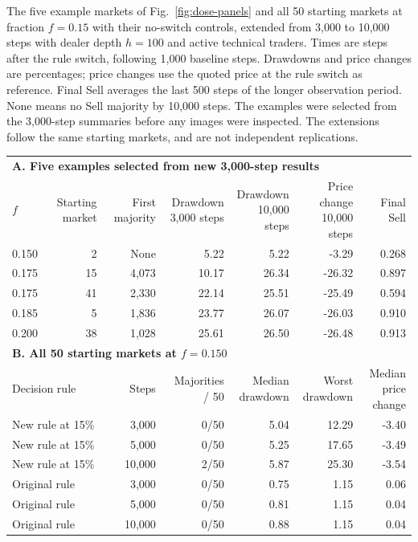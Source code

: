 \begin{center}
\begin{minipage}{\linewidth}\centering
\captionsetup{type=table,hypcap=false}
\caption{The five example markets of Fig.~\ref{fig:dose-panels} and all 50 starting markets at fraction $f=0.15$ with their no-switch controls, extended from 3,000 to 10,000 steps with dealer depth $h=100$ and active technical traders. Times are steps after the rule switch, following 1,000 baseline steps. Drawdowns and price changes are percentages; price changes use the quoted price at the rule switch as reference. Final Sell averages the last 500 steps of the longer observation period. None means no Sell majority by 10,000 steps. The examples were selected from the 3,000-step summaries before any images were inspected. The extensions follow the same starting markets, and are not independent replications.}
\label{tab:market-panel-horizons}
\footnotesize\setlength{\tabcolsep}{2.5pt}
\begin{tabular}{lrrrrrr}
\toprule
\multicolumn{7}{l}{\textbf{A. Five examples selected from new 3,000-step results}} \\
$f$ & Starting market & First majority & \shortstack{Drawdown\\3,000 steps} & \shortstack{Drawdown\\10,000 steps} & \shortstack{Price change\\10,000 steps} & Final Sell \\
0.150 & 2 & None & 5.22 & 5.22 & -3.29 & 0.268 \\
0.175 & 15 & 4,073 & 10.17 & 26.34 & -26.32 & 0.897 \\
0.175 & 41 & 2,330 & 22.14 & 25.51 & -25.49 & 0.594 \\
0.185 & 5 & 1,836 & 23.77 & 26.07 & -26.03 & 0.910 \\
0.200 & 38 & 1,028 & 25.61 & 26.50 & -26.48 & 0.913 \\
\midrule
\multicolumn{7}{l}{\textbf{B. All 50 starting markets at $f=0.150$}} \\
\multicolumn{2}{l}{Decision rule} & Steps & Majorities / 50 & \shortstack{Median\\drawdown} & \shortstack{Worst\\drawdown} & \shortstack{Median\\price change} \\
\multicolumn{2}{l}{New rule at 15\%} & 3,000 & 0/50 & 5.04 & 12.29 & -3.40 \\
\multicolumn{2}{l}{New rule at 15\%} & 5,000 & 0/50 & 5.25 & 17.65 & -3.49 \\
\multicolumn{2}{l}{New rule at 15\%} & 10,000 & 2/50 & 5.87 & 25.30 & -3.54 \\
\multicolumn{2}{l}{Original rule} & 3,000 & 0/50 & 0.75 & 1.15 & 0.06 \\
\multicolumn{2}{l}{Original rule} & 5,000 & 0/50 & 0.81 & 1.15 & 0.04 \\
\multicolumn{2}{l}{Original rule} & 10,000 & 0/50 & 0.88 & 1.15 & 0.04 \\
\bottomrule
\end{tabular}
\end{minipage}
\end{center}
